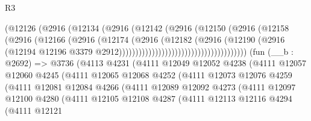 \begin{lexlean}{R3}
\begin{coremodule}
                                            (@12126
                                              (@2916
                                                (@12134
                                                  (@2916
                                                    (@12142
                                                      (@2916
                                                        (@12150
                                                          (@2916
                                                            (@12158
                                                              (@2916
                                                                (@12166
                                                                  (@2916
                                                                    (@12174
                                                                      (@2916
                                                                        (@12182
                                                                          (@2916
                                                                            (@12190
                                                                              (@2916
                                                                                (@12194
                                                                                  @12196
                                                                                  @3379
                                                                                  @2912)))))))))))))))))))))))))))))))))))))))
    (fun (__b : @2692) =>
    @3736
      (@4113
        @4231
        (@4111
          @12049
          @12052
          @4238
          (@4111
            @12057
            @12060
            @4245
            (@4111
              @12065
              @12068
              @4252
              (@4111
                @12073
                @12076
                @4259
                (@4111
                  @12081
                  @12084
                  @4266
                  (@4111
                    @12089
                    @12092
                    @4273
                    (@4111
                      @12097
                      @12100
                      @4280
                      (@4111
                        @12105
                        @12108
                        @4287
                        (@4111
                          @12113
                          @12116
                          @4294
                          (@4111
                            @12121

\end{coremodule}
\end{lexlean}
